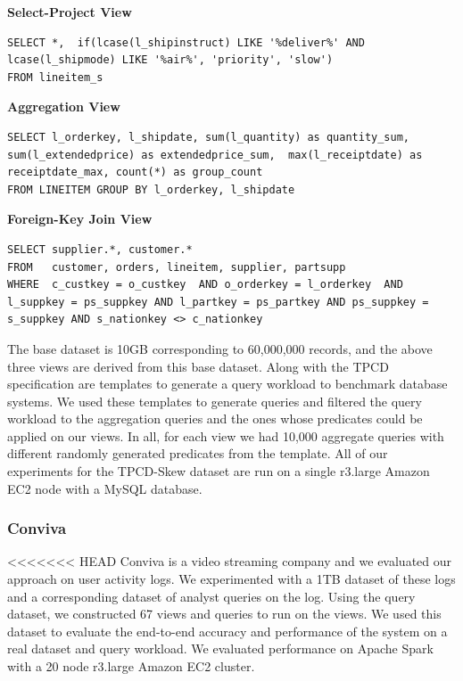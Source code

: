 
\textbf{Select-Project View}
\begin{lstlisting}
SELECT *,  if(lcase(l_shipinstruct) LIKE '%deliver%' AND lcase(l_shipmode) LIKE '%air%', 'priority', 'slow')  
FROM lineitem_s
\end{lstlisting}

\vspace{0.5em}

\textbf{Aggregation View}
\begin{lstlisting}
SELECT l_orderkey, l_shipdate, sum(l_quantity) as quantity_sum,  sum(l_extendedprice) as extendedprice_sum,  max(l_receiptdate) as receiptdate_max, count(*) as group_count 
FROM LINEITEM GROUP BY l_orderkey, l_shipdate
\end{lstlisting}

\vspace{0.5em}

\textbf{Foreign-Key Join View}
\begin{lstlisting}
SELECT supplier.*, customer.* 
FROM   customer, orders, lineitem, supplier, partsupp 
WHERE  c_custkey = o_custkey  AND o_orderkey = l_orderkey  AND l_suppkey = ps_suppkey AND l_partkey = ps_partkey AND ps_suppkey = s_suppkey AND s_nationkey <> c_nationkey
\end{lstlisting}

\vspace{1em}

The base dataset is 10GB corresponding to 60,000,000 records, and the above three views are derived from this base dataset.
Along with the TPCD specification are templates to generate a query workload to benchmark database systems.
We used these templates to generate queries and filtered the query workload to the aggregation queries and the ones whose predicates could be applied on our views.
In all, for each view we had 10,000 aggregate queries with different randomly generated predicates from the template.
All of our experiments for the TPCD-Skew dataset are run on a single r3.large Amazon EC2 node with a MySQL database.

\subsubsection{Conviva}
<<<<<<< HEAD
Conviva is a video streaming company and we evaluated our approach on user activity logs. 
We experimented with a 1TB dataset of these logs and a corresponding dataset of analyst queries on the log.
Using the query dataset, we constructed 67 views and queries to run on the views.
We used this dataset to evaluate the end-to-end accuracy and performance of the system on a real dataset and query workload.
We evaluated performance on Apache Spark with a 20 node r3.large Amazon EC2 cluster. 

